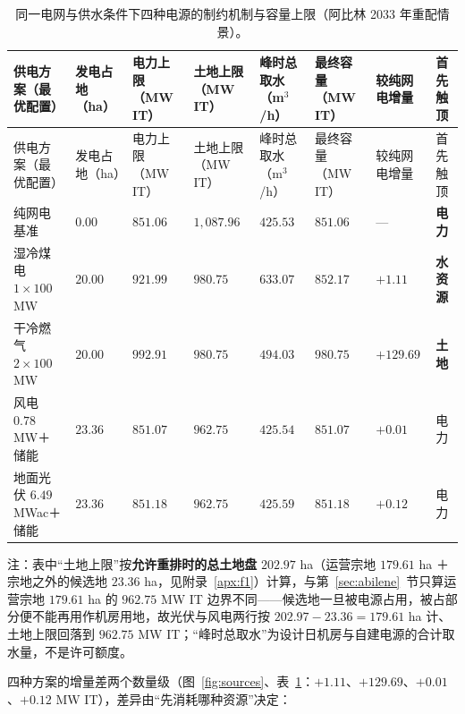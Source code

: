 {\small\setlength{\tabcolsep}{4pt}
\begin{longtable}{@{}p{}p{}p{}p{}p{}p{}p{}p{}@{}}
\caption{同一电网与供水条件下四种电源的制约机制与容量上限（阿比林 2033 年重配情景）。}
\label{tab:sources}\\
\toprule
供电方案（最优配置） & 发电占地（ha） & 电力上限（MW IT） & 土地上限（MW IT） & 峰时总取水（m$^3$/h） & 最终容量（MW IT） & 较纯网电增量 & 首先触顶 \\
\midrule
\endfirsthead
\toprule
供电方案（最优配置） & 发电占地（ha） & 电力上限（MW IT） & 土地上限（MW IT） & 峰时总取水（m$^3$/h） & 最终容量（MW IT） & 较纯网电增量 & 首先触顶 \\
\midrule
\endhead
\bottomrule
\endlastfoot
纯网电基准 & $0.00$ & $851.06$ & $1{,}087.96$ & $425.53$ & $851.06$ & — & \textbf{电力} \\
湿冷煤电 $1\times100$ MW & $20.00$ & $921.99$ & $980.75$ & $633.07$ & $852.17$ & $+1.11$ & \textbf{水资源} \\
干冷燃气 $2\times100$ MW & $20.00$ & $992.91$ & $980.75$ & $494.03$ & $980.75$ & $+129.69$ & \textbf{土地} \\
风电 $0.78$ MW＋储能 & $23.36$ & $851.07$ & $962.75$ & $425.54$ & $851.07$ & $+0.01$ & 电力 \\
地面光伏 $6.49$ MWac＋储能 & $23.36$ & $851.18$ & $962.75$ & $425.59$ & $851.18$ & $+0.12$ & 电力 \\
\end{longtable}
}

{\footnotesize
\noindent 注：表中“土地上限”按\textbf{允许重排时的总土地盘} $202.97$ ha（运营宗地 $179.61$ ha ＋宗地之外的候选地 $23.36$ ha，见附录~\ref{apx:f1}）计算，与第~\ref{sec:abilene}~节只算运营宗地 $179.61$ ha 的 $962.75$ MW IT 边界不同——候选地一旦被电源占用，被占部分便不能再用作机房用地，故光伏与风电两行按 $202.97-23.36=179.61$ ha 计、土地上限回落到 $962.75$ MW IT；“峰时总取水”为设计日机房与自建电源的合计取水量，不是许可额度。
\par}

四种方案的增量差两个数量级（图~\ref{fig:sources}、表~\ref{tab:sources}：$+1.11$、$+129.69$、$+0.01$、$+0.12$ MW IT），差异由“先消耗哪种资源”决定：

